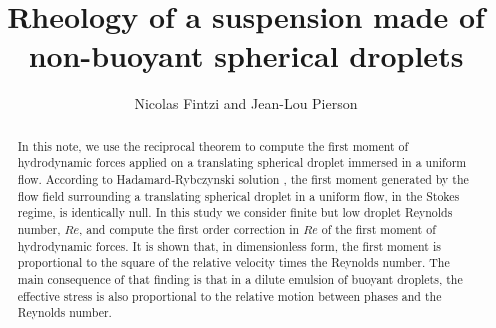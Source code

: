 \documentclass[12pt]{My_preprint}
\title{
    Rheology of a suspension made of non-buoyant spherical droplets
    }
\author[1,2]{Nicolas Fintzi and  Jean-Lou Pierson}
\begin{document}
\maketitle

\begin{abstract}
    In this note, we use the reciprocal theorem to compute the first moment of hydrodynamic forces applied on a translating spherical droplet immersed in a uniform flow. 
    According to Hadamard-Rybczynski solution \citep{kim2013microhydrodynamics}, the first moment generated by the flow field surrounding a translating spherical droplet in a uniform flow, in the Stokes regime, is identically null. 
    In this study we consider finite but low droplet Reynolds number, $Re$, and compute the first order correction in $Re$ of the first moment of hydrodynamic forces. 
    It is shown that, in dimensionless form, the first moment is proportional to the square of the relative velocity times the Reynolds number.  
    The main consequence of that finding is that in a dilute emulsion of buoyant droplets, the effective stress is also proportional to the relative motion between phases and the Reynolds number. 
\end{abstract}







\appendix
\end{document}
